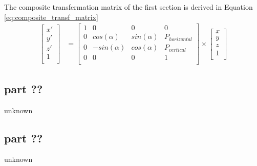 The composite transfermation matrix of the first section is derived in Equation \ref{eq:composite_transf_matrix}
\begin{align}
    \begin{bmatrix}
        x' \\
        y' \\
        z' \\
        1  \\
    \end{bmatrix}
    &=
    \begin{bmatrix}
        1 & 0 & 0 & 0 \\
        0 & cos(\alpha) & sin(\alpha) & P_{horizontal} \\
        0 & -sin(\alpha) & cos(\alpha) & P_{vertical} \\
        0 & 0 & 0 & 1 \\
    \end{bmatrix}
    \times
    \begin{bmatrix}
        x \\
        y \\
        z \\
        1 \\
    \end{bmatrix}
    \label{eq:composite_transf_matrix}
\end{align}

\subsection{part ??}
unknown
\subsection{part ??}
unknown

\newpage